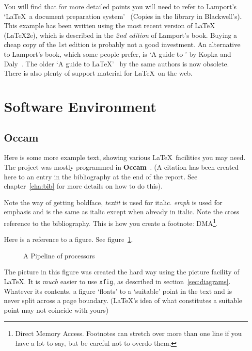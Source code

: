 You will find that for more detailed points you will need to refer to
Lamport's `\LaTeX\ a document preparation system'~\cite{lamport}
(Copies in the library  in Blackwell's).
This example has been written using the most recent version of \LaTeX
(LaTeX2e), which is described in the \emph{2nd edition} of Lamport's
book. Buying a cheap copy of the 1st edition is probably not a good
investment. An alternative to Lamport's book, which some people
prefer, is `A guide to {\LaTeXe}' by Kopka and Daly~\cite{kopka}. The
older `A guide to {\LaTeX}'~\cite{kopka-old} by the same authors is
now obsolete. There is also plenty of support material for \LaTeX\ on the web.

\section{Software Environment}
\subsection{Occam}

Here is some more example text, showing various \LaTeX\ facilities
you may need.  The project was mostly programmed in
\textbf{Occam}~\cite{occam}.  (A citation has been created  here to an
entry in the bibliography at the end of the report. See
chapter~\ref{cha:bib} for more details on how to do this).

Note the way of getting boldface, \textit{textit} is used for italic.
\emph{emph} is used for emphasis and is the same as italic except when
already in italic.  Note the cross reference to the bibliography.
This is how you create a footnote: DMA\footnote{Direct Memory Access.
	Footnotes can stretch over more than one line if you have a lot to
	say, but be careful not to overdo them.}.

Here is a reference to a figure. See figure~\ref{pipeline}.
\begin{figure}[htbp]
	\centering
	
	\caption{A Pipeline of processors
		\label{pipeline}}           %
\end{figure}
The picture in this figure was created the hard way using the picture
facility of \LaTeX. It is \emph{much} easier to use \texttt{xfig}, as
described in section~\ref{sec:diagrams}.  Whatever its contents, a
figure `floats' to a `suitable' point in the text and is never split
across a page boundary. (\LaTeX's idea of what constitutes a suitable
point may not coincide with yours)



